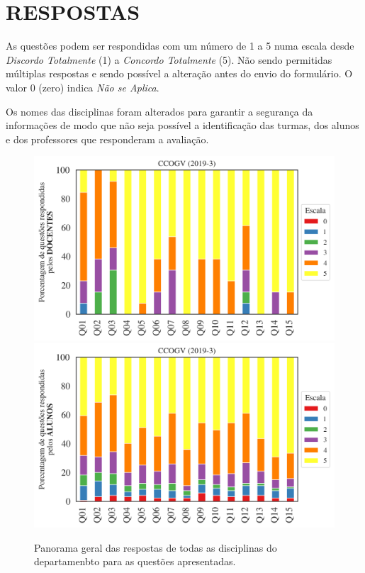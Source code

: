 \documentclass[a4paper,10pt]{article}
\begin{document}
\section{RESPOSTAS}
As questões podem ser respondidas com um número de 1 a 5 numa escala desde {\it Discordo Totalmente} (1) a {\it Concordo Totalmente} (5). Não sendo permitidas múltiplas respostas e sendo possível a alteração antes do envio do formulário. O valor 0 (zero) indica {\it Não se Aplica}.

Os nomes das disciplinas foram alterados para garantir a segurança da informações de modo que não seja possível a identificação das turmas, dos alunos  e dos professores que responderam a avaliação.

\begin{figure}[h]
\centering
\includegraphics[width=0.85\linewidth]{analise_geral_departamento_CCOGV_docentes.png}
\includegraphics[width=0.85\linewidth]{analise_geral_departamento_CCOGV_alunos.png}
\caption{\label{fig:analise_geral_departamento}            Panorama geral das respostas de todas as  disciplinas do departamenbto para as questões apresentadas.}
\end{figure}
\end{document}
